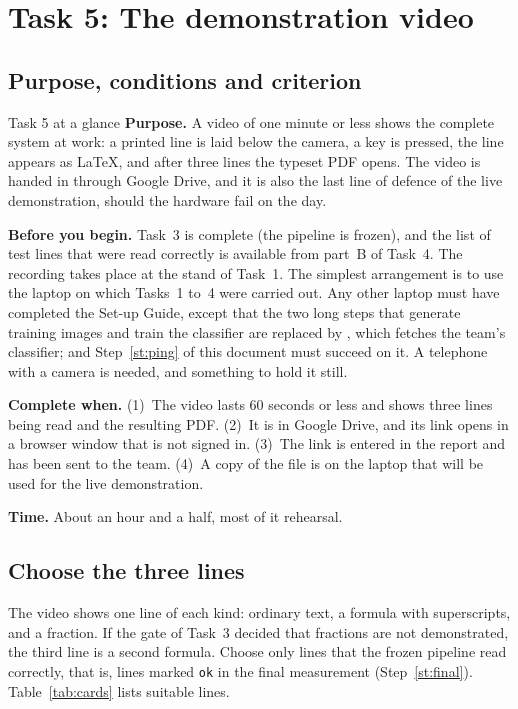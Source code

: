 \section{Task 5: The demonstration video}
\label{sec:t5}

\subsection{Purpose, conditions and criterion}

\begin{plain}{Task 5 at a glance}
\textbf{Purpose.} A video of one minute or less shows the complete system at work: a printed
line is laid below the camera, a key is pressed, the line appears as \LaTeX{}, and after three
lines the typeset PDF opens. The video is handed in through Google Drive, and it is also the
last line of defence of the live demonstration, should the hardware fail on the day.

\textbf{Before you begin.} Task~3 is complete (the pipeline is frozen), and the list of test
lines that were read correctly is available from part~B of Task~4. The recording takes place at
the stand of Task~1. The simplest arrangement is to use the laptop on which Tasks~1 to~4 were
carried out. Any other laptop must have completed the Set-up Guide, except that the two long
steps that generate training images and train the classifier are replaced by ,
which fetches the team's classifier; and Step~\ref{st:ping} of this document must succeed on
it. A telephone with a camera is needed, and something to hold it still.

\textbf{Complete when.} (1)~The video lasts 60 seconds or less and shows three lines being read
and the resulting PDF. (2)~It is in Google Drive, and its link opens in a browser window that is
not signed in. (3)~The link is entered in the report and has been sent to the team. (4)~A copy
of the file is on the laptop that will be used for the live demonstration.

\textbf{Time.} About an hour and a half, most of it rehearsal.
\end{plain}

\subsection{Choose the three lines}

The video shows one line of each kind: ordinary text, a formula with superscripts, and a
fraction. If the gate of Task~3 decided that fractions are not demonstrated, the third line is
a second formula. Choose only lines that the frozen pipeline read correctly, that is, lines
marked \texttt{ok} in the final measurement (Step~\ref{st:final}). Table~\ref{tab:cards} lists
suitable lines.

